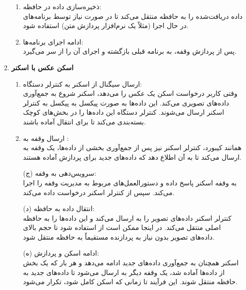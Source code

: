 \begin{qsolve}[]
\begin{enumerate}
\begin{enumerate}
			\item 
			ذخیره‌سازی داده در حافظه:\\
			داده دریافت‌شده را به حافظه  منتقل می‌کند تا در صورت نیاز توسط برنامه‌های در حال اجرا (مثلاً یک نرم‌افزار پردازش متن) استفاده شود.
			
			\item 
			ادامه اجرای برنامه‌ها:\\
			پس از پردازش وقفه،  به برنامه قبلی بازگشته و اجرای آن را از سر می‌گیرد.
			
			
		\end{enumerate}
		
		
		
		\item 
		\textbf{اسکن عکس با اسکنر}
		\begin{enumerate}
			\item 
			 ارسال سیگنال از اسکنر به کنترلر دستگاه:\\
			 وقتی کاربر درخواست اسکن یک عکس را می‌دهد، اسکنر شروع به جمع‌آوری داده‌های تصویری می‌کند. این داده‌ها به صورت پیکسل به پیکسل به کنترلر اسکنر ارسال می‌شوند. کنترلر دستگاه این داده‌ها را در بخش‌های کوچک بسته‌بندی می‌کند تا برای انتقال آماده باشند.
			 
			 \item 
			 ارسال وقفه به :\\
			 همانند کیبورد، کنترلر اسکنر نیز پس از جمع‌آوری بخشی از داده‌ها، یک وقفه به  ارسال می‌کند تا به آن اطلاع دهد که داده‌های جدید برای پردازش آماده هستند.
			 
			 
			
		\end{enumerate}
	\end{enumerate}
\end{qsolve}


\begin{qsolve}
	\begin{enumerate}
		\item [ ]
		\begin{enumerate}
			\item [(ج)]
			سرویس‌دهی به وقفه:\\
			به وقفه اسکنر پاسخ داده و دستورالعمل‌های مربوط به مدیریت وقفه را اجرا می‌کند.  سپس از کنترلر اسکنر درخواست داده می‌کند.
			
			\item [(د)]
			انتقال داده به حافظه:\\
			کنترلر اسکنر داده‌های تصویر را به  ارسال می‌کند و  این داده‌ها را به حافظه اصلی منتقل می‌کند. در اینجا ممکن است از  استفاده شود تا حجم بالای داده‌های تصویر بدون نیاز به پردازنده مستقیماً به حافظه منتقل شود.
			
			\item [(ه)]
			ادامه اسکن و پردازش:\\
			اسکنر همچنان به جمع‌آوری داده‌های جدید ادامه می‌دهد و هر بار که یک بخش از داده‌ها آماده شد، یک وقفه دیگر به  ارسال می‌شود تا داده‌های جدید به حافظه منتقل شوند. این فرآیند تا زمانی که اسکن کامل شود، تکرار می‌شود.
		\end{enumerate}
	\end{enumerate}
\end{qsolve}